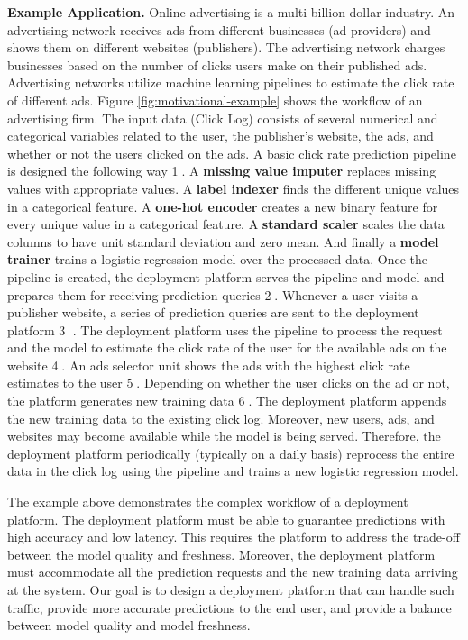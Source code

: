 \textbf{Example Application.} 
Online advertising is a multi-billion dollar industry.
An advertising network receives ads from different businesses (ad providers) and shows them on different websites (publishers).
The advertising network charges businesses based on the number of clicks users make on their published ads.
Advertising networks utilize machine learning pipelines to estimate the click rate of different ads.
Figure \ref{fig:motivational-example} shows the workflow of an advertising firm.
The input data (Click Log) consists of several numerical and categorical variables related to the user, the publisher's website, the ads, and whether or not the users clicked on the ads.
A basic click rate prediction pipeline is designed the following way \textcircled{1}. 
A \textbf{missing value imputer} replaces missing values with appropriate values.
A \textbf{label indexer} finds the different unique values in a categorical feature. 
A \textbf{one-hot encoder} creates a new binary feature for every unique value in a categorical feature.
A \textbf{standard scaler} scales the data columns to have unit standard deviation and zero mean.
And finally a \textbf{model trainer} trains a logistic regression model over the processed data.
Once the pipeline is created, the deployment platform serves the pipeline and model and prepares them for receiving prediction queries \textcircled{2}.
Whenever a user visits a publisher website, a series of prediction queries are sent to the deployment platform \textcircled{3} .
The deployment platform uses the pipeline to process the request and the model to estimate the click rate of the user for the available ads on the website \textcircled{4}.
An ads selector unit shows the ads with the highest click rate estimates to the user \textcircled{5}.
Depending on whether the user clicks on the ad or not, the platform generates new training data \textcircled{6}.
The deployment platform appends the new training data to the existing click log.
Moreover, new users, ads, and websites may become available while the model is being served.
Therefore, the deployment platform periodically (typically on a daily basis) reprocess the entire data in the click log using the pipeline and trains a new logistic regression model.

The example above demonstrates the complex workflow of a deployment platform.
The deployment platform must be able to guarantee predictions with high accuracy and low latency.
This requires the platform to address the trade-off between the model quality and freshness.
Moreover, the deployment platform must accommodate all the prediction requests and the new training data arriving at the system. 
Our goal is to design a deployment platform that can handle such traffic, provide more accurate predictions to the end user, and provide a balance between model quality and model freshness.

